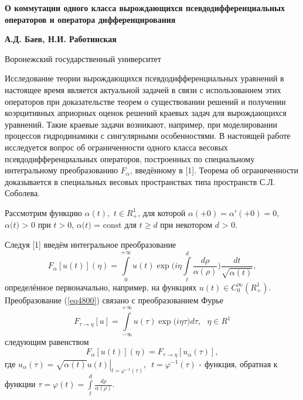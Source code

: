 \begin{center}
\textbf{О коммутации одного класса вырождающихся псевдодифференциальных
операторов и оператора дифференцирования}
\end{center}

\begin{center}
\textbf{А.Д. Баев, Н.И. Работинская}
\end{center}


\begin{center}
Воронежский государственный университет
\end{center}

{\sloppy

Исследование теории вырождающихся псевдодифференциальных уравнений в
настоящее время является актуальной задачей в связи с использованием этих
операторов при доказательстве теорем о существовании решений и получении
коэрцитивных априорных оценок решений краевых задач для вырождающихся
уравнений. Такие краевые задачи возникают, например, при моделировании
процессов гидродинамики с сингулярными особенностями. В настоящей работе
исследуется вопрос об ограниченности одного класса весовых
псевдодифференциальных операторов, построенных по специальному интегральному
преобразованию $F_\alpha $, введённому в [1]. Теорема об ограниченности
доказывается в специальных весовых пространствах типа пространств С.Л.
Соболева.

Рассмотрим функцию $\alpha (t),\,\,t \in R_ + ^1 $, для которой $\alpha ( +
0) = {\alpha }'( + 0) = 0$, $\alpha \mbox{(}t\mbox{) > 0}$ при $t > 0$,
$\alpha \mbox{(}t\mbox{) = const}$ для $t \geqslant d$ при некотором $d\mbox{ >
0}$.

Следуя [1] введём интегральное преобразование
\begin{equation}
\label{eq4800}
F_\alpha [u(t)](\eta ) = \int\limits_0^{ + \infty } {u(t)\exp (i\eta }
\int\limits_t^d {\frac{d\rho }{\alpha (\rho )}} )\frac{dt}{\sqrt {\alpha
(t)} },
\end{equation}
определённое первоначально, например, на функциях $u(t) \in C_0^\infty (R_ +
^1 )$. Преобразование (\ref{eq4800}) связано с преобразованием Фурье
\[
F_{\tau \to \eta } [u] = \int\limits_{ - \infty }^{ + \infty } {u(\tau )\exp
(i\eta } \tau )d\tau ,\,\,\,\,\eta \in R^1
\]
следующим равенством
\[
F_\alpha [u(t)](\eta ) = F_{\tau \to \eta } [u_\alpha (\tau )],
\]
где $u_\alpha (\tau ) = \left. {\sqrt {\alpha (t)} u(t)} \right|_{t =
\varphi ^{ - 1}(\tau )} ,\,\,\,t = \varphi ^{ - 1}(\tau )$ - функция,
обратная к функции $\tau = \varphi (t) = \int\limits_t^d {\frac{d\rho
}{\alpha (\rho )}} .$

}
